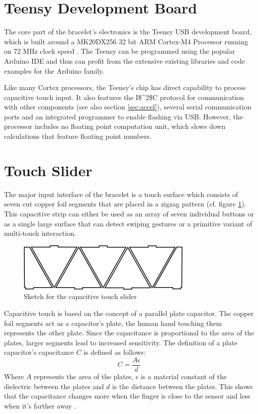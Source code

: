 \section{Teensy Development Board}
The core part of the bracelet's electronics is the Teensy USB development board, which is built around a MK20DX256 32 bit ARM Cortex-M4 Processor running on 72 MHz clock speed \cite{teensy_web}. The Teensy can be programmed using the popular Arduino IDE and thus can profit from the extensive existing libraries and code examples for the Arduino family.

Like many Cortex processors, the Teensy's chip has direct capability to process capacitive touch input. It also features the \ac{I$^2$C} protocol for communication with other components (see also section \ref{sec:accel}), several serial communication ports and an integrated programmer to enable flashing via \ac{USB}. However, the processor includes no floating point computation unit, which slows down calculations that feature floating point numbers.

\section{Touch Slider}
The major input interface of the bracelet is a touch surface which consists of seven cut copper foil segments that are placed in a zigzag pattern (cf. figure \ref{fig:sketch-touch}). This capacitive strip can either be used as an array of seven individual buttons or as a single large surface that can detect swiping gestures or a primitive variant of multi-touch interaction.

\begin{figure}[bth]
	\myfloatalign
	\begin{center}
	\includegraphics[width=.45\linewidth]{gfx/touch_slider.png}
	\end{center}
	\caption{Sketch for the capacitive touch slider}
	\label{fig:sketch-touch}
\end{figure}

Capacitive touch is based on the concept of a parallel plate capacitor. The copper foil segments act as a capacitor's plate, the human hand touching them represents the other plate. Since the capacitance is proportional to the area of the plates, larger segments lead to increased sensitivity. The definition of a plate capacitor's capacitance $C$ is defined as follows:
\[
	C = \frac{A\epsilon}{d}
\]
Where $A$ represents the area of the plates, $\epsilon$ is a material constant of the dielectric between the plates and $d$ is the distance between the plates. This shows that the capacitance changes more when the finger is close to the sensor and less when it's farther away \cite{Camacho2010}.

